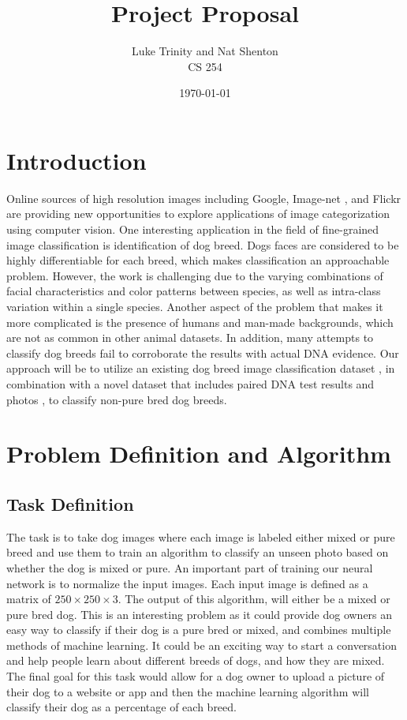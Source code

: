 \documentclass[12pt]{article}
\title{Project Proposal}
\date{\today}
\author{Luke Trinity and Nat Shenton \\  CS 254}
\begin{document}
 
\maketitle
\section{Introduction}

Online sources of high resolution images including Google, Image-net \cite{deng2009imagenet}, and Flickr are providing new opportunities to explore applications of image categorization using computer vision. One interesting application in the field of fine-grained image classification is identification of dog breed. Dogs faces are considered to be highly differentiable for each breed, which makes classification an approachable problem.  However, the work is challenging due to the varying combinations of facial characteristics and color patterns between species, as well as intra-class variation within a single species. Another aspect of the problem that makes it more complicated is the presence of humans and man-made backgrounds, which are not as common in other animal datasets. In addition, many attempts to classify dog breeds fail to corroborate the results with actual DNA evidence. Our approach will be to utilize an existing dog breed image classification dataset \cite{khosla2011novel}, in combination with a novel dataset that includes paired DNA test results and photos \cite{voith2009comparison}, to  classify non-pure bred dog breeds. 

\section{Problem Definition and Algorithm}

\subsection{Task Definition}

The task is to take dog images where each image is labeled either mixed or pure breed and use them to train an algorithm to classify an unseen photo based on whether the dog is mixed or pure.  An important part of training our neural network is to normalize the input images.  Each input image is defined as a matrix of $250\times 250\times3$.  The output of this algorithm, will either be a mixed or pure bred dog. This is an interesting problem as it could provide dog owners an easy way to classify if their dog is a pure bred or mixed, and combines multiple methods of machine learning. It could be an exciting way to start a conversation and help people learn about different breeds of dogs, and how they are mixed. The final goal for this task would allow for a dog owner to upload a picture of their dog to a website or app and then the machine learning algorithm will classify their dog as a percentage of each breed. 
\end{document}
